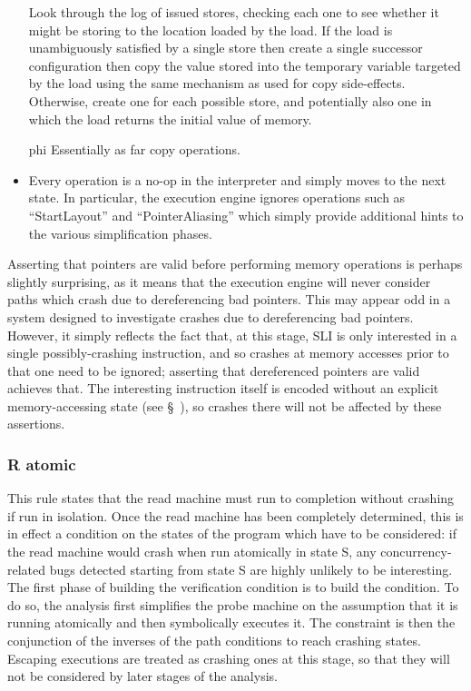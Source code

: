 \begin{itemize}
  Look through the log of issued stores, checking each one to see whether it might be storing to the location loaded by the load.
  If the load is unambiguously satisfied by a single store then create a single successor configuration then copy the value stored into the temporary variable targeted by the load using the same mechanism as used for copy side-effects.
  Otherwise, create one for each possible store, and potentially also one in which the load returns the initial value of memory.
\item[phi]
  Essentially as far copy operations.
\item
  Every operation is a no-op in the interpreter and simply moves to the next state.
  In particular, the execution engine ignores operations such as ``StartLayout'' and ``PointerAliasing'' which simply provide additional hints to the various \StateMachine simplification phases.
\end{itemize}


Asserting that pointers are valid before performing memory operations is perhaps slightly surprising, as it means that the execution engine will never consider paths which crash due to dereferencing bad pointers.
This may appear odd in a system designed to investigate crashes due to dereferencing bad pointers.
However, it simply reflects the fact that, at this stage, SLI is only interested in a single possibly-crashing instruction, and so crashes at memory accesses prior to that one need to be ignored; asserting that dereferenced pointers are valid achieves that.
The interesting instruction itself is encoded without an explicit memory-accessing state (see \S~), so crashes there will not be affected by these assertions.


\subsubsection{R atomic}

This rule states that the read machine must run to completion without crashing if run in isolation.
Once the read machine has been completely determined, this is in effect a condition on the states of the program which have to be considered: if the read machine would crash when run atomically in state S, any concurrency-related bugs detected starting from state S are highly unlikely to be interesting.
The first phase of building the verification condition is to build the condition.
To do so, the analysis first simplifies the probe machine on the assumption that it is running atomically and then symbolically executes it.
The constraint is then the conjunction of the inverses of the path conditions to reach crashing states.
Escaping executions are treated as crashing ones at this stage, so that they will not be considered by later stages of the analysis.

